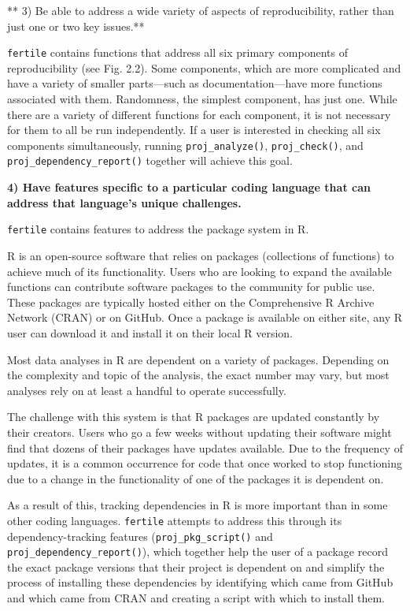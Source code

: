 \documentclass[12pt,twoside]{reedthesis}
\begin{document}
** 3) Be able to address a wide variety of aspects of reproducibility,
rather than just one or two key issues.**

\texttt{fertile} contains functions that address all six primary
components of reproducibility (see Fig. 2.2). Some components, which are
more complicated and have a variety of smaller parts---such as
documentation---have more functions associated with them. Randomness,
the simplest component, has just one. While there are a variety of
different functions for each component, it is not necessary for them to
all be run independently. If a user is interested in checking all six
components simultaneously, running \texttt{proj\_analyze()},
\texttt{proj\_check()}, and \texttt{proj\_dependency\_report()} together
will achieve this goal.

\textbf{4) Have features specific to a particular coding language that
can address that language's unique challenges.}

\texttt{fertile} contains features to address the package system in R.

R is an open-source software that relies on packages (collections of
functions) to achieve much of its functionality. Users who are looking
to expand the available functions can contribute software packages to
the community for public use. These packages are typically hosted either
on the Comprehensive R Archive Network (CRAN) or on GitHub. Once a
package is available on either site, any R user can download it and
install it on their local R version.

Most data analyses in R are dependent on a variety of packages.
Depending on the complexity and topic of the analysis, the exact number
may vary, but most analyses rely on at least a handful to operate
successfully.

The challenge with this system is that R packages are updated constantly
by their creators. Users who go a few weeks without updating their
software might find that dozens of their packages have updates
available. Due to the frequency of updates, it is a common occurrence
for code that once worked to stop functioning due to a change in the
functionality of one of the packages it is dependent on.

As a result of this, tracking dependencies in R is more important than
in some other coding languages. \texttt{fertile} attempts to address
this through its dependency-tracking features
(\texttt{proj\_pkg\_script()} and \texttt{proj\_dependency\_report()}),
which together help the user of a package record the exact package
versions that their project is dependent on and simplify the process of
installing these dependencies by identifying which came from GitHub and
which came from CRAN and creating a script with which to install them.
\end{document}
